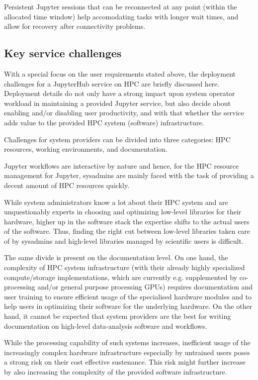 Persistent Jupyter sessions that can be reconnected at any point (within the allocated time window) help accomodating tasks with longer wait times, and allow for recovery after connectivity problems.


\subsection{Key service challenges}

With a special focus on the user requirements stated above, the deployment challenges for a JupyterHub service on HPC are briefly discussed here.
Deployment details do not only have a strong impact upon system operator workload in maintaining a provided Jupyter service, but also decide about enabling and/or disabling user productivity, and with that whether the service adds value to the provided HPC system (software) infrastructure.

Challenges for system providers can be divided into three categories: HPC resources, working environments, and documentation.

Jupyter workflows are interactive by nature and hence, for the HPC resource management for Jupyter, sysadmins are mainly faced with the task of providing a decent amount of HPC resources quickly.

While system administrators know a lot about their HPC system and are unquestionably experts in choosing and optimizing low-level libraries for their hardware, higher up in the software stack the expertise shifts to the actual users of the software.
Thus, finding the right cut between low-level libraries taken care of by sysadmins and high-level libraries managed by scientific users is difficult.

The same divide is present on the documentation level.
On one hand, the complexity of HPC system infrastructure (with their already highly specialized compute/storage implementations, which are currently e.g. supplemented by co-processing and/or general purpose processing GPUs) requires documentation and user training to ensure efficient usage of the specialised hardware modules and to help users in optimizing their software for the underlying hardware.
On the other hand, it cannot be expected that system providers are the best for writing documentation on high-level data-analysis software and workflows.

While the processing capability of such systems increases, inefficient usage of the increasingly complex hardware infrastructure especially by untrained users poses a strong risk on their cost effective sustenance\cite{}.
This risk might further increase by also increasing the complexity of the provided software infrastructure.


